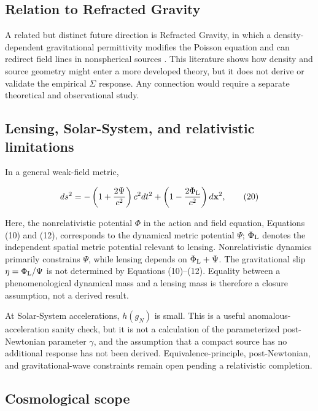 \documentclass[utf8]{FrontiersinHarvard}
\begin{document}
\subsection{Relation to Refracted Gravity}\label{relation-to-refracted-gravity}

A related but distinct future direction is Refracted Gravity, in which a density-dependent gravitational permittivity modifies the Poisson equation and can redirect field lines in nonspherical sources \citep{cesare2020,cesare2022,sanna2023}. This literature shows how density and source geometry might enter a more developed theory, but it does not derive or validate the empirical \(\Sigma\) response. Any connection would require a separate theoretical and observational study.

\subsection{Lensing, Solar-System, and relativistic limitations}\label{lensing-solar-system-and-relativistic-limitations}

In a general weak-field metric,

\[
ds^2=-\left(1+\frac{2\Psi}{c^2}\right)c^2dt^2
+\left(1-\frac{2\Phi_{\rm L}}{c^2}\right)d\mathbf x^2,
\tag{20}
\]

Here, the nonrelativistic potential \(\Phi\) in the action and field equation, Equations (10) and (12), corresponds to the dynamical metric potential \(\Psi\); \(\Phi_{\rm L}\) denotes the independent spatial metric potential relevant to lensing. Nonrelativistic dynamics primarily constrains \(\Psi\), while lensing depends on \(\Phi_{\rm L}+\Psi\). The gravitational slip \(\eta=\Phi_{\rm L}/\Psi\) is not determined by Equations (10)--(12). Equality between a phenomenological dynamical mass and a lensing mass is therefore a closure assumption, not a derived result.

At Solar-System accelerations, \(h(g_N)\) is small. This is a useful anomalous-acceleration sanity check, but it is not a calculation of the parameterized post-Newtonian parameter \(\gamma\), and the assumption that a compact source has no additional response has not been derived. Equivalence-principle, post-Newtonian, and gravitational-wave constraints remain open pending a relativistic completion.

\subsection{Cosmological scope}\label{cosmological-scope}
\end{document}
